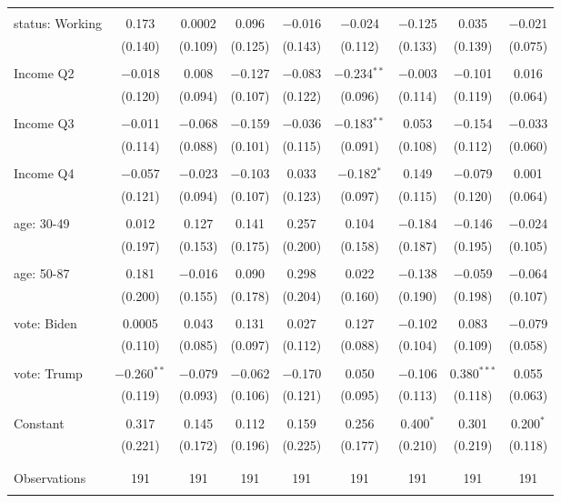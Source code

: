 \begin{tabular}{@{\extracolsep{5pt}}lcccccccc}
  & & & & & & & & \\ 
 status: Working & 0.173 & 0.0002 & 0.096 & $-$0.016 & $-$0.024 & $-$0.125 & 0.035 & $-$0.021 \\ 
  & (0.140) & (0.109) & (0.125) & (0.143) & (0.112) & (0.133) & (0.139) & (0.075) \\ 
  & & & & & & & & \\ 
 Income Q2 & $-$0.018 & 0.008 & $-$0.127 & $-$0.083 & $-$0.234$^{**}$ & $-$0.003 & $-$0.101 & 0.016 \\ 
  & (0.120) & (0.094) & (0.107) & (0.122) & (0.096) & (0.114) & (0.119) & (0.064) \\ 
  & & & & & & & & \\ 
 Income Q3 & $-$0.011 & $-$0.068 & $-$0.159 & $-$0.036 & $-$0.183$^{**}$ & 0.053 & $-$0.154 & $-$0.033 \\ 
  & (0.114) & (0.088) & (0.101) & (0.115) & (0.091) & (0.108) & (0.112) & (0.060) \\ 
  & & & & & & & & \\ 
 Income Q4 & $-$0.057 & $-$0.023 & $-$0.103 & 0.033 & $-$0.182$^{*}$ & 0.149 & $-$0.079 & 0.001 \\ 
  & (0.121) & (0.094) & (0.107) & (0.123) & (0.097) & (0.115) & (0.120) & (0.064) \\ 
  & & & & & & & & \\ 
 age: 30-49 & 0.012 & 0.127 & 0.141 & 0.257 & 0.104 & $-$0.184 & $-$0.146 & $-$0.024 \\ 
  & (0.197) & (0.153) & (0.175) & (0.200) & (0.158) & (0.187) & (0.195) & (0.105) \\ 
  & & & & & & & & \\ 
 age: 50-87 & 0.181 & $-$0.016 & 0.090 & 0.298 & 0.022 & $-$0.138 & $-$0.059 & $-$0.064 \\ 
  & (0.200) & (0.155) & (0.178) & (0.204) & (0.160) & (0.190) & (0.198) & (0.107) \\ 
  & & & & & & & & \\ 
 vote: Biden & 0.0005 & 0.043 & 0.131 & 0.027 & 0.127 & $-$0.102 & 0.083 & $-$0.079 \\ 
  & (0.110) & (0.085) & (0.097) & (0.112) & (0.088) & (0.104) & (0.109) & (0.058) \\ 
  & & & & & & & & \\ 
 vote: Trump & $-$0.260$^{**}$ & $-$0.079 & $-$0.062 & $-$0.170 & 0.050 & $-$0.106 & 0.380$^{***}$ & 0.055 \\ 
  & (0.119) & (0.093) & (0.106) & (0.121) & (0.095) & (0.113) & (0.118) & (0.063) \\ 
  & & & & & & & & \\ 
 Constant & 0.317 & 0.145 & 0.112 & 0.159 & 0.256 & 0.400$^{*}$ & 0.301 & 0.200$^{*}$ \\ 
  & (0.221) & (0.172) & (0.196) & (0.225) & (0.177) & (0.210) & (0.219) & (0.118) \\ 
  & & & & & & & & \\ 
\hline \\[-1.8ex] 

Observations & 191 & 191 & 191 & 191 & 191 & 191 & 191 & 191 \\ 
\hline 
\hline \\[-1.8ex] 
\end{tabular} 